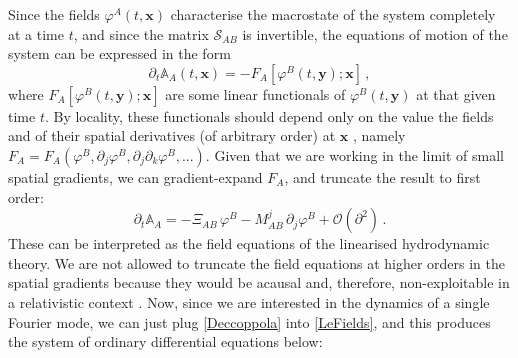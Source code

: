 \documentclass[a4paper, amsfonts, amssymb, amsmath, reprint, showkeys, nofootinbib, twoside, onecolumn,notitlepage]{revtex4-1}
\begin{document}
Since the fields $\varphi^A(t,\textbf{x})$ characterise the macrostate of the system completely at a time $t$, and since the matrix $\mathcal{S}_{AB}$ is invertible, the equations of motion of the system can be expressed in the form
\begin{equation}
\partial_t \mathbb{A}_A(t,\textbf{x})=-F_A[\varphi^B(t,\textbf{y});\textbf{x}] \, ,
\end{equation} 
where $F_A[\varphi^B(t,\textbf{y});\textbf{x}]$ are some linear functionals of $\varphi^B(t,\textbf{y})$ at that given time $t$. By locality, these functionals should depend only on the value the fields and of their spatial derivatives (of arbitrary order) at $\textbf{x}$ \cite{GavassinoFronntiers2021}, namely $F_A=F_A(\varphi^B, \partial_j \varphi^B,\partial_j \partial_k \varphi^B,...)$. Given that we are working in the limit of small spatial gradients, we can gradient-expand $F_A$, and truncate the result to first order:
\begin{equation}\label{LeFields}
\partial_t \mathbb{A}_A = -\Xi_{AB} \, \varphi^B -M^j_{AB} \, \partial_j \varphi^B + \mathcal{O}(\partial^2) \, .
\end{equation}
These can be interpreted as the field equations of the linearised hydrodynamic theory.
We are not allowed to truncate the field equations at higher orders in the spatial gradients because they would be acausal \cite{CourantHilbert2_book} and, therefore, non-exploitable in a relativistic context \cite{GavassinoCausality2021,
GavassinoSuperluminal2021,GavassinoStabilityCarter2022}. Now, since we are interested in the dynamics of a single Fourier mode, we can just plug \eqref{Deccoppola} into \eqref{LeFields}, and this produces the system of ordinary differential equations below:
\end{document}

